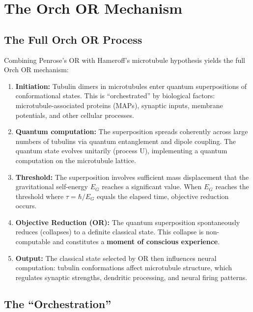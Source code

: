 \documentclass[11pt,a4paper]{report}
\begin{document}
\chapter{The Orch OR Mechanism}

\section{The Full Orch OR Process}

Combining Penrose's OR with Hameroff's microtubule hypothesis yields the full Orch OR mechanism:

\begin{principlebox}
\begin{enumerate}[leftmargin=1.5em]
  \item \textbf{Initiation:} Tubulin dimers in microtubules enter quantum superpositions of conformational states. This is ``orchestrated'' by biological factors: microtubule-associated proteins (MAPs), synaptic inputs, membrane potentials, and other cellular processes.
  \item \textbf{Quantum computation:} The superposition spreads coherently across large numbers of tubulins via quantum entanglement and dipole coupling. The quantum state evolves unitarily (process U), implementing a quantum computation on the microtubule lattice.
  \item \textbf{Threshold:} The superposition involves sufficient mass displacement that the gravitational self-energy $E_G$ reaches a significant value. When $E_G$ reaches the threshold where $\tau = \hbar/E_G$ equals the elapsed time, objective reduction occurs.
  \item \textbf{Objective Reduction (OR):} The quantum superposition spontaneously reduces (collapses) to a definite classical state. This collapse is non-computable and constitutes a \textbf{moment of conscious experience}.
  \item \textbf{Output:} The classical state selected by OR then influences neural computation: tubulin conformations affect microtubule structure, which regulates synaptic strengths, dendritic processing, and neural firing patterns.
\end{enumerate}
\end{principlebox}

\section{The ``Orchestration''}
\end{document}
